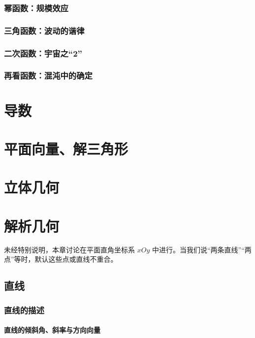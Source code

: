 \documentclass[a4paper,openany]{ctexbook}
\begin{document}
\subsection{幂函数：规模效应}

\subsection{三角函数：波动的谐律}

\subsection{二次函数：宇宙之“2”}

\subsection{再看函数：混沌中的确定}

\chapter{导数}

\chapter{平面向量、解三角形}

\chapter{立体几何}

\chapter{解析几何}

未经特别说明，本章讨论在平面直角坐标系 \(xOy\) 中进行。当我们说“两条直线”“两点”等时，默认这些点或直线不重合。

\section{直线}

\subsection{直线的描述}

\subsubsection{直线的倾斜角、斜率与方向向量}
\end{document}
